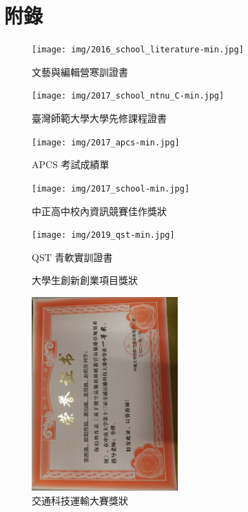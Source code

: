\documentclass[classical]{einfart}
\begin{document}
\part{附錄}

\begin{figure}[H]
  \centering
  \texttt{[image: img/2016\_school\_literature-min.jpg]}
  \caption{文藝與編輯營寒訓證書}
\end{figure}

\begin{figure}[H]
  \centering
  \texttt{[image: img/2017\_school\_ntnu\_C-min.jpg]}
  \caption{臺灣師範大學大學先修課程證書}
\end{figure}

\begin{figure}[H]
  \centering
  \texttt{[image: img/2017\_apcs-min.jpg]}
  \caption{APCS 考試成績單}
\end{figure}

\begin{figure}[H]
  \centering
  \texttt{[image: img/2017\_school-min.jpg]}
  \caption{中正高中校內資訊競賽佳作獎狀}
\end{figure}

\begin{figure}[H]
  \centering
  \texttt{[image: img/2019\_qst-min.jpg]}
  \caption{QST 青軟實訓證書}
\end{figure}

\begin{figure}[H]
  \centering
    \caption{大學生創新創業項目獎狀}
\end{figure}

\begin{figure}[H]
  \centering
  \includegraphics[width=0.5\textwidth, angle=270]{img/2021_traffic-min.png}
  \caption{交通科技運輸大賽獎狀}
\end{figure}
\end{document}
